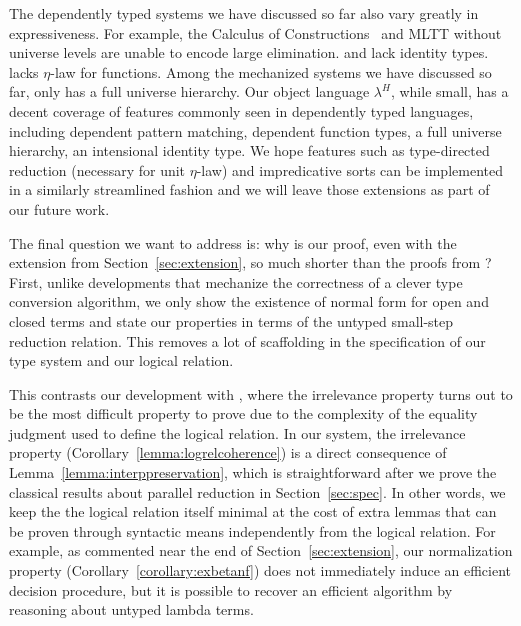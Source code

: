 \documentclass[acmsmall]{acmart}
\newcommand{\lang}{$\lambda^H$\xspace}
\begin{document}
The dependently typed systems we have discussed so far also vary
greatly in expressiveness. For example, the Calculus of
Constructions~\citep{CoC} and MLTT without universe levels are unable
to encode large elimination. \citet{decagda} and \citet{nbeincoq} lack
identity types. \citet{nbeincoq} lacks $\eta$-law for functions. Among
the mechanized systems we have discussed so far, only
\citet{anand2014towards} has a full universe hierarchy.
Our object language \lang{}, while small, has a decent coverage of
features commonly seen in dependently typed languages, including
dependent pattern matching, dependent function types, a full universe
hierarchy, an intensional identity type. We hope features such as
type-directed reduction (necessary for unit $\eta$-law) and
impredicative sorts can be implemented in a similarly streamlined
fashion and we will leave those extensions as part of our future work.


The final question we want to address is: why is our proof,
even with the extension from Section~\ref{sec:extension}, so much
shorter than the proofs from \citet{decagda, nbeincoq,
  martin-lof-a-la-coq}?
First, unlike developments that mechanize the correctness of a clever
type conversion algorithm, we only show the existence of
normal form for open and closed terms and state our properties in
terms of the untyped small-step reduction relation. This removes a lot
of scaffolding in the specification of our type system and our logical
relation.

This contrasts our development with
\citet{martin-lof-a-la-coq}, where the irrelevance property turns out to be the most
difficult property to prove due to the complexity of the equality
judgment used to define the logical relation. In our system, the
irrelevance property (Corollary~\ref{lemma:logrelcoherence}) is a
direct consequence of Lemma~\ref{lemma:interppreservation}, which is
straightforward after we prove the classical results about parallel
reduction in Section~\ref{sec:spec}. In other words, we keep the
the logical relation itself minimal at the cost of extra lemmas that can be proven
through syntactic means independently from the logical relation.
For example, as commented near the end of Section~\ref{sec:extension},
our normalization property (Corollary~\ref{corollary:exbetanf})
does not immediately induce an efficient decision procedure, but it is
possible to recover an efficient algorithm by reasoning about untyped
lambda terms.
\end{document}
